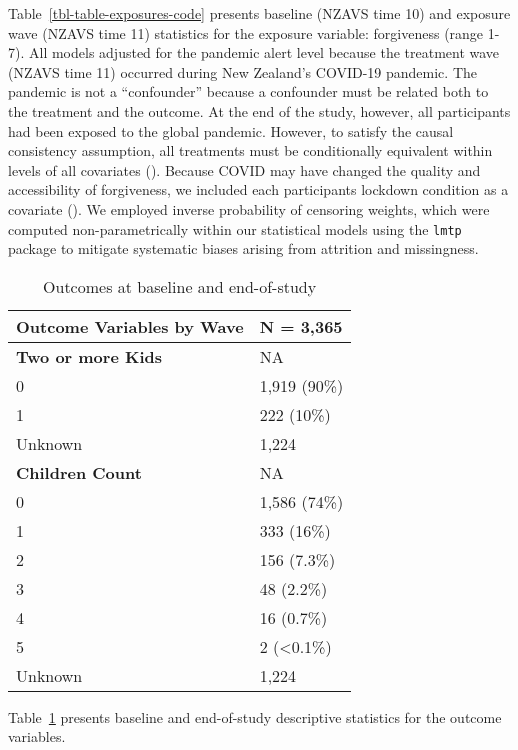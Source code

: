 \documentclass[
  single column]{article}
\begin{document}
Table~\ref{tbl-table-exposures-code} presents baseline (NZAVS time 10)
and exposure wave (NZAVS time 11) statistics for the exposure variable:
forgiveness (range 1-7). All models adjusted for the pandemic alert
level because the treatment wave (NZAVS time 11) occurred during New
Zealand's COVID-19 pandemic. The pandemic is not a ``confounder''
because a confounder must be related both to the treatment and the
outcome. At the end of the study, however, all participants had been
exposed to the global pandemic. However, to satisfy the causal
consistency assumption, all treatments must be conditionally equivalent
within levels of all covariates
(). Because
COVID may have changed the quality and accessibility of forgiveness, we
included each participants lockdown condition as a covariate
(). We employed inverse
probability of censoring weights, which were computed non-parametrically
within our statistical models using the \texttt{lmtp} package to
mitigate systematic biases arising from attrition and missingness.

\newpage{}

\begin{longtable}[]{@{}ll@{}}

\caption{\label{tbl-table-outcomes}Outcomes at baseline and
end-of-study}

\tabularnewline

\toprule\noalign{}
\textbf{Outcome Variables by Wave} & \textbf{N = 3,365} \\
\midrule\noalign{}
\endhead
\bottomrule\noalign{}
\endlastfoot
\textbf{Two or more Kids} & NA \\
0 & 1,919 (90\%) \\
1 & 222 (10\%) \\
Unknown & 1,224 \\
\textbf{Children Count} & NA \\
0 & 1,586 (74\%) \\
1 & 333 (16\%) \\
2 & 156 (7.3\%) \\
3 & 48 (2.2\%) \\
4 & 16 (0.7\%) \\
5 & 2 (\textless0.1\%) \\
Unknown & 1,224 \\

\end{longtable}

Table~\ref{tbl-table-outcomes} presents baseline and end-of-study
descriptive statistics for the outcome variables.
\end{document}
